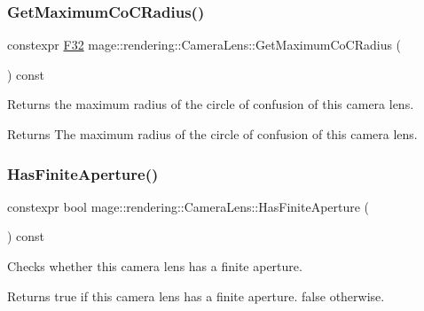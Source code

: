 \subsubsection{\texorpdfstring{Get\+Maximum\+Co\+C\+Radius()}{GetMaximumCoCRadius()}}
{\footnotesize\ttfamily constexpr \hyperlink{namespacemage_aa97e833b45f06d60a0a9c4fc22ae02c0}{F32} mage\+::rendering\+::\+Camera\+Lens\+::\+Get\+Maximum\+Co\+C\+Radius (\begin{DoxyParamCaption}{ }\end{DoxyParamCaption}) const\hspace{0.3cm}{\ttfamily [noexcept]}}

Returns the maximum radius of the circle of confusion of this camera lens.

\begin{DoxyReturn}{Returns}
The maximum radius of the circle of confusion of this camera lens. 
\end{DoxyReturn}
\hypertarget{classmage_1_1rendering_1_1_camera_lens_a09a7cc18ca89da0c177c4f7dc0bbcc41}{}\label{classmage_1_1rendering_1_1_camera_lens_a09a7cc18ca89da0c177c4f7dc0bbcc41} 
\subsubsection{\texorpdfstring{Has\+Finite\+Aperture()}{HasFiniteAperture()}}
{\footnotesize\ttfamily constexpr bool mage\+::rendering\+::\+Camera\+Lens\+::\+Has\+Finite\+Aperture (\begin{DoxyParamCaption}{ }\end{DoxyParamCaption}) const\hspace{0.3cm}{\ttfamily [noexcept]}}

Checks whether this camera lens has a finite aperture.

\begin{DoxyReturn}{Returns}
{\ttfamily true} if this camera lens has a finite aperture. {\ttfamily false} otherwise. 
\end{DoxyReturn}
\hypertarget{classmage_1_1rendering_1_1_camera_lens_addbc0f6e5ca70e491022edde1bf6f691}{}\label{classmage_1_1rendering_1_1_camera_lens_addbc0f6e5ca70e491022edde1bf6f691} 
